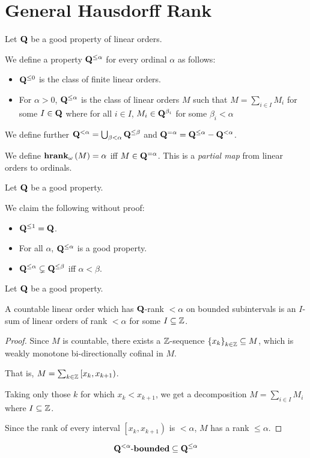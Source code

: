 
\section{General Hausdorff Rank}

\begin{definition}
  Let $\mathbf{Q}$ be a good property of linear orders.

  We define a property $\mathbf{Q}^{\le \alpha}$
  for every ordinal $\alpha$ as follows:

  \begin{itemize}
    \item $\mathbf{Q}^{\le 0}$ is the class of finite linear orders.
    \item For $\alpha > 0$, $\mathbf{Q}^{\le \alpha}$ is the class of linear orders $M$ such that
          $M = \sum_{i \in I} M_i$ for some $I \in \mathbf{Q}$ where
          for all $i \in I$, $M_i \in \mathbf{Q}^{\beta_i}$ for some $\beta_i < \alpha$
  \end{itemize}

  We define further $\mathbf{Q}^{< \alpha} = \bigcup_{\beta < \alpha} \mathbf{Q}^{\le \beta}$
  and $\mathbf{Q}^{=\alpha} = \mathbf{Q}^{\le \alpha} - \mathbf{Q}^{< \alpha}$.

  We define $\mathbf{hrank}_{\omega}\left( M \right) = \alpha$ iff $M \in \mathbf{Q}^{= \alpha}$.
  This is a \emph{partial map} from linear orders to ordinals.
\end{definition}

\begin{observations}
  Let $\mathbf{Q}$ be a good property.

  We claim the following without proof:

  \begin{itemize}
    \item $\mathbf{Q}^{\le 1} = \mathbf{Q}$.
    \item For all $\alpha$, $\mathbf{Q}^{\le \alpha}$ is a good property.
    \item $\mathbf{Q}^{\le \alpha} \subsetneq \mathbf{Q}^{\le \beta}$ iff $\alpha < \beta$.
  \end{itemize}
\end{observations}

\begin{lemma}
  Let $\mathbf{Q}$ be a good property.

  A countable linear order which has $\mathbf{Q}$-rank $< \alpha$
  on bounded subintervals is an $I$-sum of 
  linear orders of rank $< \alpha$ for some $I \subseteq \mathbb{Z}$.
\end{lemma}

\begin{proof}
  Since $M$ is countable, there exists a $\mathbb{Z}$-sequence $\left\{ {x_k} \right\}_{k \in \mathbb{Z}} \subseteq M$,
  which is weakly monotone bi-directionally cofinal in $M$.

  That is, $M = \sum_{k \in \mathbb{Z}} \left[ x_k, x_{k + 1} \right)$.

  Taking only those $k$ for which $x_k < x_{k + 1}$, we get a decomposition
  $M = \sum_{i \in I} M_i$ where $I \subseteq \mathbb{Z}$.

  Since the rank of every interval $\left[ x_k, x_{k + 1} \right)$ is $< \alpha$,
  $M$ has a rank $\le \alpha$.
\end{proof}

\begin{corollary}
  $${\mathbf{Q}^{< \alpha}} \text{-} \mathbf{bounded} \subseteq \mathbf{Q}^{\le \alpha}$$
\end{corollary}